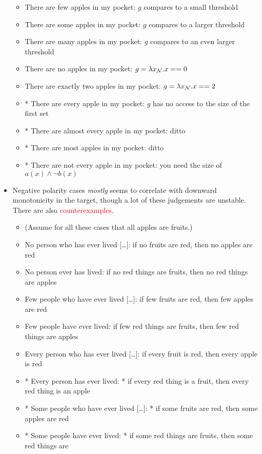 \documentclass[a4paper]{article}
\begin{document}
\begin{itemize}
  \begin{itemize}
  \item There are few apples in my pocket: $g$ compares to a small threshold
  \item There are some apples in my pocket: $g$ compares to a larger threshold
  \item There are many apples in my pocket: $g$ compares to an even larger threshold
  \item There are no apples in my pocket: $g = \lambda x_{\mathcal{N}}. x == 0$
  \item There are exactly two apples in my pocket: $g = \lambda x_{\mathcal{N}}. x == 2$
  \item * There are every apple in my pocket: $g$ has no access to the size of the first set
  \item * There are almost every apple in my pocket: ditto
  \item * There are most apples in my pocket: ditto
  \item * There are not every apple in my pocket: you need the size of $a(x) \land \lnot b(x)$
  \end{itemize}
\item Negative polarity cases \emph{mostly} seems to correlate with downward monotonicity in the target,
  though a lot of these judgements are unstable. There are also \textcolor{red}{counterexamples}.
  \begin{itemize}
  \item (Assume for all these cases that all apples are fruits.)
  \item No person who has ever lived [\ldots]: if no fruits are red, then no apples are red
  \item No person ever has lived: if no red things are fruits, then no red things are apples
  \item Few people who have ever lived [\ldots]: if few fruits are red, then few apples are red
  \item Few people have ever lived: if few red things are fruits, then few red things are apples
  \item Every person who has ever lived [\ldots]: if every fruit is red, then every apple is red
  \item * Every person has ever lived: * if every red thing is a fruit, then every red thing is an apple
  \item * Some people who have ever lived [\ldots]: * if some fruits are red, then some apples are red
  \item * Some people have ever lived: * if some red things are fruits, then some red things are

\end{itemize}
\end{itemize}
\end{document}
